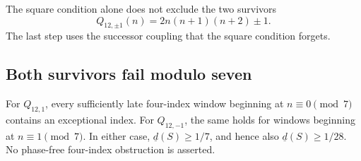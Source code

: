 \documentclass[11pt]{article}
\begin{document}
The square condition alone does not exclude the two survivors
\begin{equation}\label{long243:eq:survivors}
 Q_{12,\pm1}(n)=2n(n+1)(n+2)\pm1 .
\end{equation}
The last step uses the successor coupling that the square condition forgets.

\subsection{Both survivors fail modulo seven}\label{long243:sec:modseven}

\begin{lemma}\label{long243:res:modseven}
For $Q_{12,1}$, every sufficiently late four-index window beginning at
$n\equiv0\pmod7$ contains an exceptional index. For $Q_{12,-1}$, the same
holds for windows beginning at $n\equiv1\pmod7$. In either case,
$\underline d(S)\ge1/7$, and hence also $\underline d(S)\ge1/28$.
No phase-free four-index obstruction is asserted.
\end{lemma}
\end{document}
